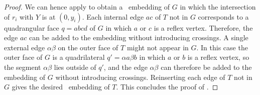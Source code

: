 \begin{proof}

	We can hence apply  to
	obtain a \Fary\ embedding of $G$ in which the intersection of $r_i$
	with $Y$ is at $(0,y_i)$.  Each internal edge $ac$ of $T$ not in $G$
	corresponds to a quadrangular face $q=abcd$ of $G$ in which $a$ or $c$ is a
	reflex vertex.  Therefore, the edge $ac$ can be added to the embedding
	without introducing crossings.  A single external edge $\alpha\beta$
	on the outer face of $T$ might not appear in $G$. In this case the outer
	face of $G$ is a quadrilateral $q'=\alpha a \beta b$ in which $a$ or $b$ is
	a reflex vertex, so the segment $\alpha\beta$ lies outside of $q'$, and the edge $\alpha\beta$ can therefore be added to the embedding of $G$
	without introducing crossings. Reinserting each edge of $T$ not in $G$ gives the desired
	\Fary\ embedding of $T$. This concludes the proof of .
\end{proof}
	
